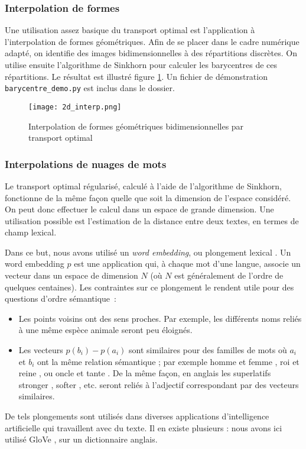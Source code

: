 \subsubsection{Interpolation de formes}
Une utilisation assez basique du transport optimal est l'application à l'interpolation de formes géométriques. 
Afin de se placer dans le cadre numérique adapté, on identifie des images bidimensionnelles à des répartitions discrètes.
On utilise ensuite l'algorithme de Sinkhorn pour calculer les barycentres de ces répartitions.
Le résultat est illustré figure \ref{fig:2d_interp}.
Un fichier de démonstration \texttt{barycentre\_demo.py} est inclus dans le dossier.

\begin{figure}
\centering
\texttt{[image: 2d\_interp.png]}
\caption{Interpolation de formes géométriques bidimensionnelles par transport optimal}
\label{fig:2d_interp}
\end{figure}

\subsubsection{Interpolations de nuages de mots}
Le transport optimal régularisé, calculé à l'aide de l'algorithme de Sinkhorn, fonctionne de la même façon quelle que soit la dimension de l'espace considéré. On peut donc effectuer le calcul dans un espace de grande dimension. Une utilisation possible est l'estimation de la distance entre deux textes, en termes de champ lexical.

Dans ce but, nous avons utilisé un \emph{word embedding}, ou plongement lexical \cite{mikolov13}. Un word embedding $p$ est une application qui, à chaque mot d'une langue, associe un vecteur dans un espace de dimension $N$ (où $N$ est généralement de l'ordre de quelques centaines). Les contraintes sur ce plongement le rendent utile pour des questions d'ordre sémantique~:
\begin{itemize}
\item Les points voisins ont des sens proches. Par exemple, les différents noms reliés à une même espèce animale seront peu éloignés.
\item Les vecteurs $p(b_i) - p(a_i)$ sont similaires pour des familles de mots où $a_i$ et $b_i$ ont la même relation sémantique ; par exemple \og homme \fg et \og femme \fg, \og roi \fg et \og reine \fg, ou \og oncle \fg et \og tante \fg. De la même façon, en anglais les superlatifs \og stronger \fg, \og softer \fg, etc. seront reliés à l'adjectif correspondant par des vecteurs similaires.
\end{itemize}
De tels plongements sont utilisés dans diverses applications d'intelligence artificielle qui travaillent avec du texte. Il en existe plusieurs : nous avons ici utilisé \og GloVe \fg \cite{glove}, sur un dictionnaire anglais.

